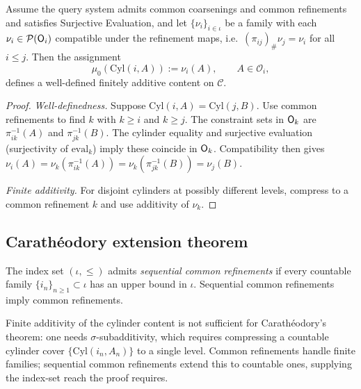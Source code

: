\begin{lemma}
\label{thm:finite-content}
Assume the query system admits common coarsenings and common refinements and satisfies Surjective Evaluation, and let $\{\nu_i\}_{i \in \iota}$ be a family with each $\nu_i \in \mathcal{P}(\mathsf{O}_{i})$ compatible under the refinement maps, i.e.\ $(\pi_{ij})_\# \nu_j = \nu_i$ for all $i \leq j$. Then the assignment
\[
  \mu_0(\mathrm{Cyl}(i, A)) := \nu_i(A),
  \qquad A \in \mathcal{O}_i,
\]
defines a well-defined finitely additive content on $\mathcal{C}$.
\end{lemma}

\begin{proof}
\textit{Well-definedness.}
Suppose $\mathrm{Cyl}(i, A) = \mathrm{Cyl}(j, B)$.  Use common refinements to find $k$ with $k \geq i$ and $k \geq j$.  The constraint sets in $\mathsf{O}_{k}$ are $\pi_{ik}^{-1}(A)$ and $\pi_{jk}^{-1}(B)$.  The cylinder equality and surjective evaluation (surjectivity of $\mathrm{eval}_k$) imply these coincide in $\mathsf{O}_{k}$.  Compatibility then gives $\nu_i(A) = \nu_k(\pi_{ik}^{-1}(A)) = \nu_k(\pi_{jk}^{-1}(B)) = \nu_j(B)$.

\textit{Finite additivity.}
For disjoint cylinders at possibly different levels, compress to a common refinement $k$ and use additivity of $\nu_k$.
\end{proof}

\subsection{Carathéodory extension theorem}

\begin{definition}
The index set $(\iota, \leq)$ admits \emph{sequential common refinements} if every countable family $\{i_n\}_{n \geq 1} \subset \iota$ has an upper bound in $\iota$. Sequential common refinements imply common refinements.
\end{definition}

\noindent Finite additivity of the cylinder content is not sufficient for Carathéodory's theorem: one needs $\sigma$-subadditivity, which requires compressing a countable cylinder cover $\{\mathrm{Cyl}(i_n, A_n)\}$ to a single level. Common refinements handle finite families; sequential common refinements extend this to countable ones, supplying the index-set reach the proof requires.

